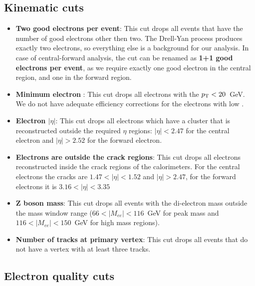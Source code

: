 \subsection{Kinematic cuts}
\label{sec:Sel_kinematic}

\begin{itemize}
\item {\bfseries Two good electrons per event}: This cut drops all events that have the number of good electrons other then two. The Drell-Yan process produces exactly two electrons, so everything else is a background for our analysis. In case of central-forward analysis, the cut can be renamed as {\bfseries 1+1 good electrons per event}, as we require exactly one good electron in the central region, and one in the forward region.
\item {\bfseries Minimum electron \pt}: This cut drops all electrons with the $p_{\mathrm{T}} < 20$~GeV. We do not have adequate efficiency corrections for the electrons with low \pt.
\item {\bfseries Electron $|\eta|$}: This cut drops all electrons which have a cluster that is reconstructed outside the required $\eta$ regions: $|\eta| < 2.47$ for the central electron and $|\eta| > 2.52$ for the forward electron.
\item {\bfseries Electrons are outside the crack regions}: This cut drops all electrons reconstructed inside the crack regions of the calorimeters. For the central electrons the cracks are $1.47 < |\eta| < 1.52$ and $|\eta| > 2.47$, for the forward electrons it is $3.16 < |\eta| < 3.35$
\item {\bfseries Z boson mass}: This cut drops all events with the di-electron mass outside the mass window range ($66 < |M_{ee}| < 116$~GeV for peak mass and $116 < |M_{ee}| < 150$~GeV for high mass regions).
\item {\bfseries Number of tracks at primary vertex}: This cut drops all events that do not have a vertex with at least three tracks.
\end{itemize}

\subsection{Electron quality cuts}
\label{sec:Sel_isem_iso}

